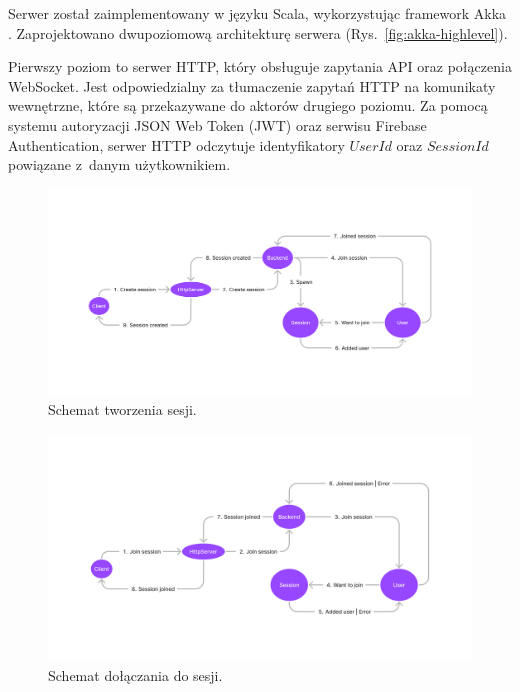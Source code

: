 Serwer został zaimplementowany w języku Scala,
wykorzystując framework Akka \cite{Akka}.
Zaprojektowano dwupoziomową architekturę serwera
(Rys.~\ref{fig:akka-highlevel}).

Pierwszy poziom to serwer HTTP, który obsługuje
zapytania API oraz połączenia WebSocket.
Jest odpowiedzialny za tłumaczenie zapytań HTTP na
komunikaty wewnętrzne, które są przekazywane do
aktorów drugiego poziomu.
Za pomocą systemu autoryzacji JSON Web Token (JWT)
oraz serwisu Firebase Authentication,
serwer HTTP odczytuje identyfikatory $UserId$ oraz
$SessionId$ powiązane z~danym użytkownikiem.


\begin{figure}[!]
  \centering
  \includegraphics[width=\textwidth]{img/akka/CreateSession.png}
  \caption{Schemat tworzenia sesji.}
  \label{fig:akka-createsession}
\end{figure}

\begin{figure}[!]
  \centering
  \includegraphics[width=\textwidth]{img/akka/JoinSession.png}
  \caption{Schemat dołączania do sesji.}
  \label{fig:akka-joinsession}
\end{figure}

